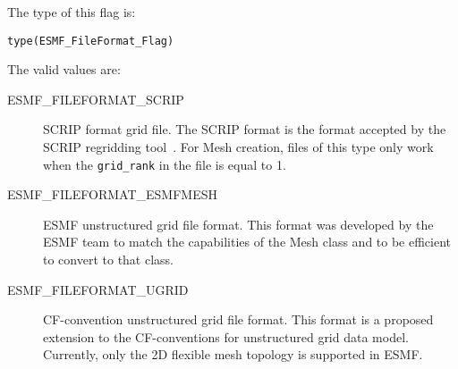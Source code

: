 The type of this flag is:

{\tt type(ESMF\_FileFormat\_Flag)}

The valid values are:
\begin{description}
\item [ESMF\_FILEFORMAT\_SCRIP] SCRIP format grid file. The SCRIP format is the format accepted by the SCRIP regridding tool~\cite{ref:SCRIP}.   For Mesh creation, files of this type only work when the {\tt grid\_rank} in the file is equal to 1.

\item [ESMF\_FILEFORMAT\_ESMFMESH] ESMF unstructured grid file format. This format was developed by the ESMF team to match the capabilities of the Mesh class and to be efficient to convert to that class. 

\item [ESMF\_FILEFORMAT\_UGRID] CF-convention unstructured grid file format. This format is a proposed extension to the 
CF-conventions for unstructured grid data model. Currently, only the 2D flexible mesh topology is supported in ESMF.
\end{description}
